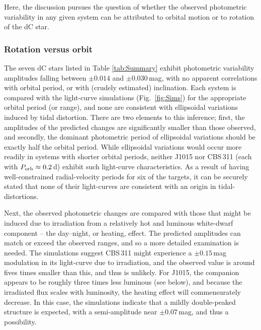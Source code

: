 \documentclass[fleqn,usenatbib,useAMS]{mnras}
\begin{document}
Here, the discussion pursues the question of whether the observed photometric variability in any given system can be attributed to orbital motion or to rotation of the dC star.

\subsubsection{Rotation versus orbit}

The seven dC stars listed in Table \ref{tab:Summary} exhibit photometric variability amplitudes falling between $\pm0.014$ and $\pm0.030$\,mag, with no apparent correlations with orbital period, or with (crudely estimated) inclination.  Each system is compared with the light-curve simulations (Fig.~\ref{fig:Sims}) for the appropriate orbital period (or range), and none are consistent with ellipsoidal variations induced by tidal distortion.  There are two elements to this inference; first, the amplitudes of the predicted changes are significantly smaller than those observed, and secondly, the dominant photometric period of ellipsoidal variations should be exactly half the orbital period.  While ellipsoidal variations would occur more readily in systems with shorter orbital periods, neither J1015 nor CBS\,311 (each with $P_{\rm orb}\approx0.2$\,d) exhibit such light-curve characteristics.  As a result of having well-constrained radial-velocity periods for six of the targets, it can be securely stated that none of their light-curves are consistent with an origin in tidal-distortions.

Next, the observed photometric changes are compared with those that might be induced due to irradiation from a relatively hot and luminous white-dwarf component -- the day--night, or heating, effect.  The predicted amplitudes can match or exceed the observed ranges, and so a more detailed examination is needed.  The simulations suggest CBS\,311 might experience a $\pm0.15$\,mag modulation in its light-curve due to irradiation, and the observed value is around fives times smaller than this, and thus is unlikely.  For J1015, the companion appears to be roughly three times less luminous (see below), and because the irradiated flux scales with luminosity, the heating effect will commensurately decrease.  In this case, the simulations indicate that a mildly double-peaked structure is expected, with a semi-amplitude near $\pm0.07$\,mag, and thus a possibility.  
\end{document}
